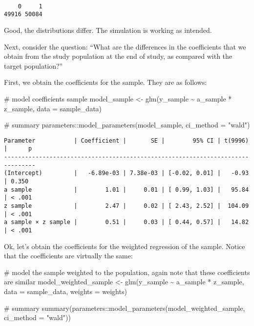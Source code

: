 \documentclass[
  singlecolumn]{article}
\newenvironment{Shaded}{\begin{snugshade}}{\end{snugshade}}
\newcommand{\AttributeTok}[1]{\textcolor[rgb]{0.40,0.45,0.13}{#1}}
\newcommand{\CommentTok}[1]{\textcolor[rgb]{0.37,0.37,0.37}{#1}}
\newcommand{\FunctionTok}[1]{\textcolor[rgb]{0.28,0.35,0.67}{#1}}
\newcommand{\NormalTok}[1]{\textcolor[rgb]{0.00,0.23,0.31}{#1}}
\newcommand{\OtherTok}[1]{\textcolor[rgb]{0.00,0.23,0.31}{#1}}
\newcommand{\SpecialCharTok}[1]{\textcolor[rgb]{0.37,0.37,0.37}{#1}}
\newcommand{\StringTok}[1]{\textcolor[rgb]{0.13,0.47,0.30}{#1}}
\begin{document}
\begin{verbatim}

    0     1 
49916 50084 
\end{verbatim}

Good, the distributions differ. The simulation is working as intended.

Next, consider the question: ``What are the differences in the
coefficients that we obtain from the study population at the end of
study, as compared with the target population?''

First, we obtain the coefficients for the sample. They are as follows:

\begin{Shaded}
\begin{Highlighting}[]
\CommentTok{\# model coefficients sample}
\NormalTok{model\_sample  }\OtherTok{\textless{}{-}}
  \FunctionTok{glm}\NormalTok{(y\_sample }\SpecialCharTok{\textasciitilde{}}\NormalTok{ a\_sample }\SpecialCharTok{*}\NormalTok{ z\_sample, }\AttributeTok{data =}\NormalTok{ sample\_data)}

\CommentTok{\# summary}
\NormalTok{parameters}\SpecialCharTok{::}\FunctionTok{model\_parameters}\NormalTok{(model\_sample, }\AttributeTok{ci\_method =} \StringTok{"wald"}\NormalTok{)}
\end{Highlighting}
\end{Shaded}

\begin{verbatim}
Parameter           | Coefficient |       SE |        95% CI | t(9996) |      p
-------------------------------------------------------------------------------
(Intercept)         |   -6.89e-03 | 7.38e-03 | [-0.02, 0.01] |   -0.93 | 0.350 
a sample            |        1.01 |     0.01 | [ 0.99, 1.03] |   95.84 | < .001
z sample            |        2.47 |     0.02 | [ 2.43, 2.52] |  104.09 | < .001
a sample × z sample |        0.51 |     0.03 | [ 0.44, 0.57] |   14.82 | < .001
\end{verbatim}

Ok, let's obtain the coefficients for the weighted regression of the
sample. Notice that the coefficients are virtually the same:

\begin{Shaded}
\begin{Highlighting}[]
\CommentTok{\# model the sample weighted to the population, again note that these coefficients are similar }
\NormalTok{model\_weighted\_sample }\OtherTok{\textless{}{-}}
  \FunctionTok{glm}\NormalTok{(y\_sample }\SpecialCharTok{\textasciitilde{}}\NormalTok{  a\_sample  }\SpecialCharTok{*}\NormalTok{ z\_sample,}
      \AttributeTok{data =}\NormalTok{ sample\_data,}
      \AttributeTok{weights =}\NormalTok{ weights)}

\CommentTok{\# summary}
\FunctionTok{summary}\NormalTok{(parameters}\SpecialCharTok{::}\FunctionTok{model\_parameters}\NormalTok{(model\_weighted\_sample, }\AttributeTok{ci\_method =}
                                       \StringTok{"wald"}\NormalTok{))}
\end{Highlighting}
\end{Shaded}
\end{document}
